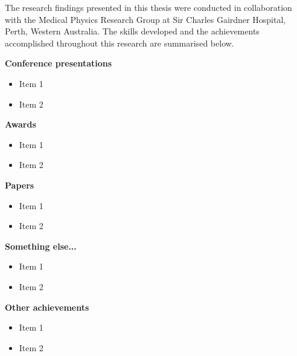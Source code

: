 The research findings presented in this thesis were conducted in collaboration with the Medical Physics Research Group at Sir Charles Gairdner Hospital, Perth, Western Australia. The skills developed and the achievements accomplished throughout this research are summarised below.





\textbf{Conference presentations}
\begin{itemize}
    \item Item 1
    \item Item 2
\end{itemize}

\textbf{Awards}
\begin{itemize}
    \item Item 1
    \item Item 2
\end{itemize}


\textbf{Papers}
\begin{itemize}
  \item Item 1
  \item Item 2
\end{itemize}

\textbf{Something else...}
\begin{itemize}
  \item Item 1
  \item Item 2
\end{itemize}

\textbf{Other achievements}
\begin{itemize}
    \item Item 1
    \item Item 2
\end{itemize}


